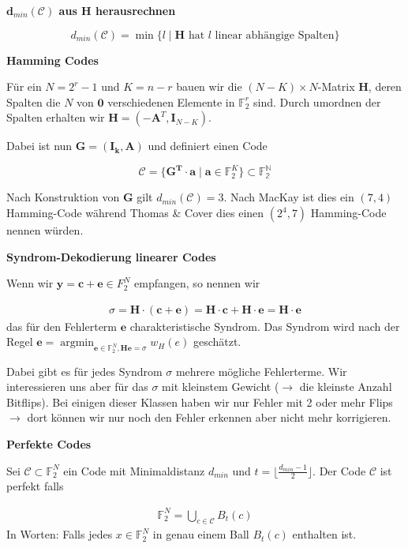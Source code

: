 \documentclass[25pt]{sciposter}
\newcommand{\C}{\mathcal{C}}
\newenvironment{defn}[1]{\begin{mdframed}[backgroundcolor=blue!10,innertopmargin=15pt, nobreak=true,innerbottommargin=15pt]
		\textbf{#1 }
	}
	{ 
	\end{mdframed}
}
\newenvironment{thm}[1]{\begin{mdframed}[nobreak=true,backgroundcolor=Emerald!10,innertopmargin=15pt, innerbottommargin=15pt]
		\textbf{#1 }
	}
	{ 
	\end{mdframed}
}
\begin{document}
\begin{multicols}{3}
\begin{thm}{$\mathbf d_{min}(\C)$ aus $\mathbf{H}$ herausrechnen}
	 $$d_{min}(\C) = \min \{l \mid \mathbf{H} \text{ hat $l$ linear abhängige Spalten} \}$$
\end{thm}


\begin{defn}{Hamming Codes}
	Für ein $N = 2^r-1$ und $K=n-r$ bauen wir die $(N-K)\times N$-Matrix $\mathbf{H}$, deren Spalten die $N$ von $\mathbf{0}$ verschiedenen Elemente in $\mathbb{F}_2^r$ sind. Durch umordnen der Spalten erhalten wir $\mathbf{H} = (-\mathbf{A}^T,\mathbf{I}_{N-K})$.
	
	Dabei ist nun $\mathbf{G = (I_k,A)}$ und definiert einen Code 
	
	$$\C = \{\mathbf{G^T\cdot a \mid a} \in \mathbb{F}_2^K\}\subset \mathbb{F_2^N}$$
	
	Nach Konstruktion von $\mathbf{G}$ gilt $d_{min}(\C) = 3$. Nach MacKay ist dies ein $(7,4)$ Hamming-Code während Thomas \& Cover dies einen $(2^4,7)$ Hamming-Code nennen würden.
\end{defn}

\begin{thm}{Syndrom-Dekodierung linearer Codes}
	Wenn wir $\mathbf{y = c+e}\in F_2^N$ empfangen, so nennen wir 
	
	\begin{align*}
		\sigma = \mathbf{H\cdot (c+e)} = \mathbf{H\cdot c + H \cdot e} = \mathbf{H \cdot e} 
	\end{align*}
	das für den Fehlerterm $\mathbf{e}$ charakteristische Syndrom. Das Syndrom wird nach der Regel $\mathbf{e} = \operatorname{argmin}_{\mathbf{e}\in \mathbb{F}_2^N, \mathbf{He}=\sigma}w_H(e)$  geschätzt.
\end{thm}

Dabei gibt es für jedes Syndrom $\sigma$ mehrere mögliche Fehlerterme. Wir interessieren uns aber für das $\sigma$ mit kleinstem Gewicht ($\rightarrow$ die kleinste Anzahl Bitflips). Bei einigen dieser Klassen haben wir nur Fehler mit 2 oder mehr Flips $\rightarrow$ dort können wir nur noch den Fehler erkennen aber nicht mehr korrigieren.


\begin{defn}{Perfekte Codes}
	Sei $\C \subset \mathbb{F}_2^N$ ein Code mit Minimaldistanz $d_{min}$ und $t = \lfloor \frac{d_{min} -1}{2} \rfloor$. Der Code $\C$ ist perfekt falls 
	
	\begin{align*}
		\mathbb{F}_2^N = \bigcup_{c\in \C} B_t(c)
	\end{align*}
	In Worten: Falls jedes $x\in\mathbb{F}_2^N$ in genau einem Ball $B_t(c)$ enthalten ist.
\end{defn}


\end{multicols}
\end{document}

